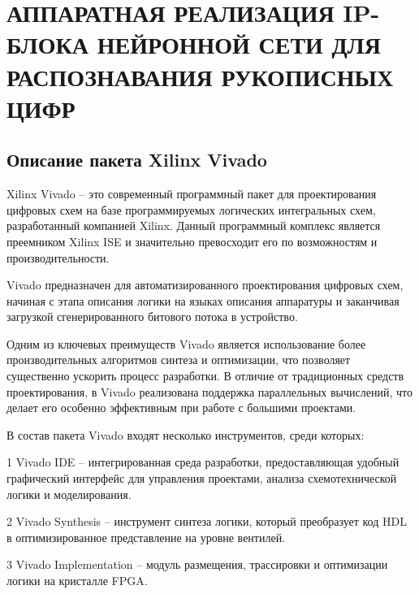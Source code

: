 \chapter[Аппаратная реализация IP-блока нейронной сети для распознавания рукописных цифр]
{АППАРАТНАЯ РЕАЛИЗАЦИЯ IP-БЛОКА НЕЙРОННОЙ СЕТИ ДЛЯ РАСПОЗНАВАНИЯ РУКОПИСНЫХ ЦИФР}

\section{Описание пакета Xilinx Vivado}
\hspace*{12.5 mm}Xilinx Vivado – это современный программный пакет для 
проектирования цифровых схем на базе программируемых логических интегральных 
схем, разработанный компанией Xilinx. Данный программный комплекс 
является преемником Xilinx ISE и значительно превосходит его по возможностям и 
производительности. 

Vivado предназначен для автоматизированного проектирования 
цифровых схем, начиная с этапа описания логики на языках описания аппаратуры 
и заканчивая загрузкой сгенерированного битового потока в 
устройство\cite{XilinxUG}.  

Одним из ключевых преимуществ Vivado является использование более 
производительных алгоритмов синтеза и оптимизации, что позволяет существенно 
ускорить процесс разработки. В отличие от традиционных средств проектирования, 
в Vivado реализована поддержка параллельных вычислений, что делает его особенно
эффективным при работе с большими проектами.  

В состав пакета Vivado входят несколько инструментов, среди 
которых\cite{XilinxUG}:  

  1 {Vivado IDE} – интегрированная среда разработки, предоставляющая удобный 
графический интерфейс для управления проектами, анализа схемотехнической логики
и моделирования.

  2 {Vivado Synthesis} – инструмент синтеза логики, который преобразует код HDL
в оптимизированное представление на уровне вентилей.

  3 {Vivado Implementation} – модуль размещения, трассировки и оптимизации 
логики на кристалле FPGA.\@

